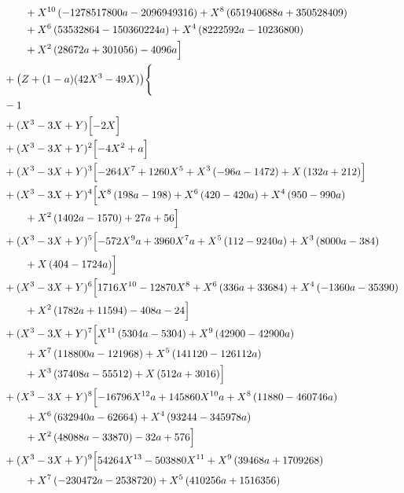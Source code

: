 \begin{align*}
&\qquad + X^{10} \left(- 1278517800 a - 2096949316\right) + X^{8} \left(651940688 a + 350528409\right)\\
&\qquad + X^{6} \left(53532864 - 150360224 a\right) + X^{4} \left(8222592 a - 10236800\right)\\
&\qquad + X^{2} \left(28672 a + 301056\right) - 4096 a\Bigr]\\
&{}+\bigl(Z+(1-a)(42X^3-49X)\bigr)\Biggl\{\\
&{}- 1\\
&{}+(X^3-3X+Y)\Bigl[- 2 X\Bigr]\\
&{}+(X^3-3X+Y)^{2}\Bigl[- 4 X^{2} + a\Bigr]\\
&{}+(X^3-3X+Y)^{3}\Bigl[- 264 X^{7} + 1260 X^{5} + X^{3} \left(- 96 a - 1472\right) + X \left(132 a + 212\right)\Bigr]\\
&{}+(X^3-3X+Y)^{4}\Bigl[X^{8} \left(198 a - 198\right) + X^{6} \left(420 - 420 a\right) + X^{4} \left(950 - 990 a\right)\\
&\qquad + X^{2} \left(1402 a - 1570\right) + 27 a + 56\Bigr]\\
&{}+(X^3-3X+Y)^{5}\Bigl[- 572 X^{9} a + 3960 X^{7} a + X^{5} \left(112 - 9240 a\right) + X^{3} \left(8000 a - 384\right)\\
&\qquad + X \left(404 - 1724 a\right)\Bigr]\\
&{}+(X^3-3X+Y)^{6}\Bigl[1716 X^{10} - 12870 X^{8} + X^{6} \left(336 a + 33684\right) + X^{4} \left(- 1360 a - 35390\right)\\
&\qquad + X^{2} \left(1782 a + 11594\right) - 408 a - 24\Bigr]\\
&{}+(X^3-3X+Y)^{7}\Bigl[X^{11} \left(5304 a - 5304\right) + X^{9} \left(42900 - 42900 a\right)\\
&\qquad + X^{7} \left(118800 a - 121968\right) + X^{5} \left(141120 - 126112 a\right)\\
&\qquad + X^{3} \left(37408 a - 55512\right) + X \left(512 a + 3016\right)\Bigr]\\
&{}+(X^3-3X+Y)^{8}\Bigl[- 16796 X^{12} a + 145860 X^{10} a + X^{8} \left(11880 - 460746 a\right)\\
&\qquad + X^{6} \left(632940 a - 62664\right) + X^{4} \left(93244 - 345978 a\right)\\
&\qquad + X^{2} \left(48088 a - 33870\right) - 32 a + 576\Bigr]\\
&{}+(X^3-3X+Y)^{9}\Bigl[54264 X^{13} - 503880 X^{11} + X^{9} \left(39468 a + 1709268\right)\\
&\qquad + X^{7} \left(- 230472 a - 2538720\right) + X^{5} \left(410256 a + 1516356\right)\\

\end{align*}
